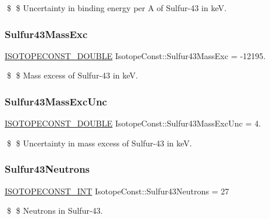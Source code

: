 \$ \$ Uncertainty in binding energy per A of Sulfur-\/43 in keV. \mbox{\label{group___isotope_const-_sulfur-_s43_ga378b392363ecdc4dece7d0a5ed4c2a4b}} 
\subsubsection{\texorpdfstring{Sulfur43\+Mass\+Exc}{Sulfur43MassExc}}
{\footnotesize\ttfamily \mbox{\hyperlink{group___isotope_const-_macros_ga8f45a7272ce02c0b4c65c44636ed719a}{I\+S\+O\+T\+O\+P\+E\+C\+O\+N\+S\+T\+\_\+\+D\+O\+U\+B\+LE}} Isotope\+Const\+::\+Sulfur43\+Mass\+Exc = -\/12195.}

\$ \$ Mass excess of Sulfur-\/43 in keV. \mbox{\label{group___isotope_const-_sulfur-_s43_ga6e0161fc3ee25f0d2160025d46e63d0d}} 
\subsubsection{\texorpdfstring{Sulfur43\+Mass\+Exc\+Unc}{Sulfur43MassExcUnc}}
{\footnotesize\ttfamily \mbox{\hyperlink{group___isotope_const-_macros_ga8f45a7272ce02c0b4c65c44636ed719a}{I\+S\+O\+T\+O\+P\+E\+C\+O\+N\+S\+T\+\_\+\+D\+O\+U\+B\+LE}} Isotope\+Const\+::\+Sulfur43\+Mass\+Exc\+Unc = 4.}

\$ \$ Uncertainty in mass excess of Sulfur-\/43 in keV. \mbox{\label{group___isotope_const-_sulfur-_s43_ga55539fe80db25fc5ecb70ab49e6b0ab5}} 
\subsubsection{\texorpdfstring{Sulfur43\+Neutrons}{Sulfur43Neutrons}}
{\footnotesize\ttfamily \mbox{\hyperlink{group___isotope_const-_macros_ga5f18360b3e99483a35c32d789e62621c}{I\+S\+O\+T\+O\+P\+E\+C\+O\+N\+S\+T\+\_\+\+I\+NT}} Isotope\+Const\+::\+Sulfur43\+Neutrons = 27}

\$ \$ Neutrons in Sulfur-\/43. \mbox{\label{group___isotope_const-_sulfur-_s43_ga2bead5cc3e5cf531bd5ad4de3bb4742d}} 
